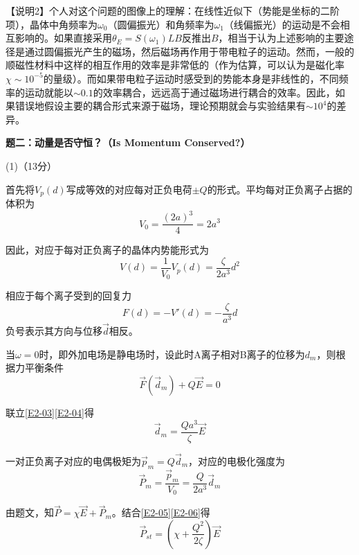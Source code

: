 \documentclass[10pt,a4paper,onecolumn,UTF8]{ctexart}
\begin{document}
	【说明2】个人对这个问题的图像上的理解：在线性近似下（势能是坐标的二阶项），晶体中角频率为$\omega_0$（圆偏振光）和角频率为$\omega_1$（线偏振光）的运动是不会相互影响的。如果直接采用$\theta_E=S(\omega_1)LB$反推出$B$，相当于认为上述影响的主要途径是通过圆偏振光产生的磁场，然后磁场再作用于带电粒子的运动。然而，一般的顺磁性材料中这样的相互作用的效率是非常低的（作为估算，可以认为是磁化率$\chi\sim10^{-5}$的量级）。而如果带电粒子运动时感受到的势能本身是非线性的，不同频率的运动就能以$\sim0.1$的效率耦合，远远高于通过磁场进行耦合的效率。因此，如果错误地假设主要的耦合形式来源于磁场，理论预期就会与实验结果有$\sim10^4$的差异。
	
	\setcounter{equation}{0}
	
	\newpage
	
	\noindent
	\textbf{题二：动量是否守恒？（Is Momentum Conserved?）}
	
	(1)（13分）
	
	首先将$V_p(d)$写成等效的对应每对正负电荷$\pm Q$的形式。平均每对正负离子占据的体积为
	\begin{equation}\label{E2-01}
		V_0=\frac{(2a)^3}{4}=2a^3
	\end{equation}
	
	因此，对应于每对正负离子的晶体内势能形式为
	\begin{equation}\label{E2-02}
		V(d)=\frac{1}{V_0}V_p(d)=\frac{\zeta}{2a^3}d^2
	\end{equation}
	
	相应于每个离子受到的回复力
	\begin{equation}\label{E2-03}
		F(d)=-V'(d)=-\frac{\zeta}{a^3}d
	\end{equation}
	负号表示其方向与位移$\vec d$相反。
	
	当$\omega=0$时，即外加电场是静电场时，设此时A离子相对B离子的位移为$d_m$，则根据力平衡条件
	\begin{equation}\label{E2-04}
		\vec F(\vec d_m)+Q\vec E=0
	\end{equation}
	
	联立\eqref{E2-03}\eqref{E2-04}得
	\begin{equation}\label{E2-05}
		\vec{d}_m=\frac{Qa^3}{\zeta}\vec E
	\end{equation}
	
	一对正负离子对应的电偶极矩为$\vec p_m=Q\vec{d}_m$，对应的电极化强度为
	\begin{equation}\label{E2-06}
		\vec P_m=\frac{\vec p_m}{V_0}=\frac{Q}{2a^3}\vec d_m
	\end{equation}
	
	由题文，知$\vec{P}=\chi\vec E+\vec P_m$。结合\eqref{E2-05}\eqref{E2-06}得
	\begin{equation}\label{E2-07}
		\vec{P}_{st}=\left(\chi+\frac{Q^2}{2\zeta}\right)\vec E
	\end{equation}
	
\end{document}
